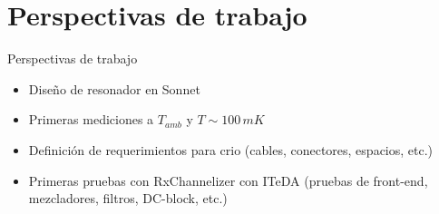 \documentclass[ignorenonframetext,12pt]{beamer}
\begin{document}
\section{Perspectivas de trabajo}
\begin{frame}{Perspectivas de trabajo}
				\begin{itemize}
								\item Dise\~no de resonador en Sonnet
								\item Primeras mediciones a $T_{amb}$ y $T \sim 100\,mK$
								\item Definici\'on de requerimientos para crio (cables,
												conectores, espacios, etc.)
								\item Primeras pruebas con RxChannelizer con ITeDA (pruebas de
												front-end, mezcladores, filtros, DC-block, etc.)
				\end{itemize}
\end{frame}
%
%
%
%
%
%
%
%
%
%
%
%
%
\end{document}
